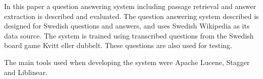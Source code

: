 In this paper a question answering system including passage retrieval and answer 
extraction is described and evaluated.
The question answering system described is designed for Swedish questions and answers, and 
uses Swedish Wikipedia as its data source. The system is trained using transcribed 
questions from the Swedish board game Kvitt eller dubbelt. These questions are also used 
for testing.

The main tools used when developing the system were Apache Lucene, Stagger and Liblinear.
